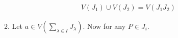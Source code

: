 \begin{enumerate}[label=\ilabel]
\begin{enumerate}
                \begin{gather*}
                    V(J_1) \cup V(J_2) = V(J_1J_2)
                \end{gather*}
            \item
                Let $a \in V(\sum_{\lambda \in I} J_\lambda)$. Now for any $P \in J_i$.
        \end{enumerate}
\end{enumerate}